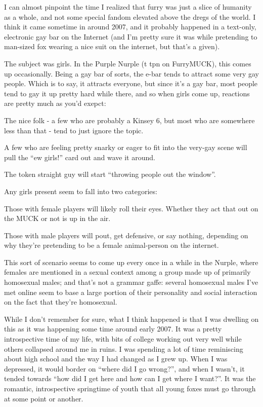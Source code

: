 
I can almost pinpoint the time I realized that furry was just a slice of humanity as a whole, and not some special fandom elevated above the dregs of the world. I think it came sometime in around 2007, and it probably happened in a text-only, electronic gay bar on the Internet (and I'm pretty sure it was while pretending to man-sized fox wearing a nice suit on the internet, but that's a given).

The subject was girls. In the Purple Nurple (t tpn on FurryMUCK), this comes up occasionally. Being a gay bar of sorts, the e-bar tends to attract some very gay people. Which is to say, it attracts everyone, but since it's a gay bar, most people tend to gay it up pretty hard while there, and so when girls come up, reactions are pretty much as you'd exepct:

The nice folk - a few who are probably a Kinsey 6, but most who are somewhere less than that - tend to just ignore the topic.

A few who are feeling pretty snarky or eager to fit into the very-gay scene will pull the ``ew girls!'' card out and wave it around.

The token straight guy will start ``throwing people out the window''.

Any girls present seem to fall into two categories:

Those with female players will likely roll their eyes. Whether they act that out on the MUCK or not is up in the air.

Those with male players will pout, get defensive, or say nothing, depending on why they're pretending to be a female animal-person on the internet.

This sort of scenario seems to come up every once in a while in the Nurple, where females are mentioned in a sexual context among a group made up of primarily homosexual males; and that's not a grammar gaffe: several homosexual males I've met online seem to base a large portion of their personality and social interaction on the fact that they're homosexual.

While I don't remember for sure, what I think happened is that I was dwelling on this as it was happening some time around early 2007. It was a pretty introspective time of my life, with bits of college working out very well while others collapsed around me in ruins. I was spending a lot of time reminiscing about high school and the way I had changed as I grew up. When I was depressed, it would border on ``where did I go wrong?'', and when I wasn't, it tended towards ``how did I get here and how can I get where I want?''. It was the romantic, introspective springtime of youth that all young foxes must go through at some point or another.

